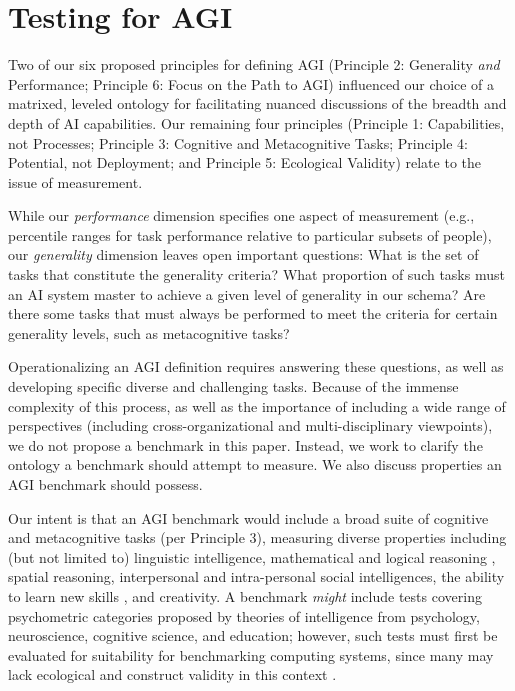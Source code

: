 \documentclass{article}
\theoremstyle{plain}
\theoremstyle{definition}
\theoremstyle{remark}
\begin{document}
\section{Testing for AGI}
\label{testing}

Two of our six proposed principles for defining AGI (Principle 2: Generality \textit{and} Performance; Principle 6: Focus on the Path to AGI) influenced our choice of a matrixed, leveled ontology for facilitating nuanced discussions of the breadth and depth of AI capabilities. Our remaining four principles (Principle 1: Capabilities, not Processes; Principle 3: Cognitive and Metacognitive Tasks; Principle 4: Potential, not Deployment; and Principle 5: Ecological Validity) relate to the issue of measurement.  

While our \textit{performance} dimension specifies one aspect of measurement (e.g., percentile ranges for task performance relative to particular subsets of people), our \textit{generality} dimension leaves open important questions: What is the set of tasks that constitute the generality criteria? What proportion of such tasks must an AI system master to achieve a given level of generality in our schema? Are there some tasks that must always be performed to meet the criteria for certain generality levels, such as metacognitive tasks?

Operationalizing an AGI definition requires answering these questions, as well as developing specific diverse and challenging tasks. Because of the immense complexity of this process, as well as the importance of including a wide range of perspectives (including cross-organizational and multi-disciplinary viewpoints), we do not propose a benchmark in this paper. Instead, we work to clarify the ontology a benchmark should attempt to measure. We also discuss properties an AGI benchmark should possess. 

Our intent is that an AGI benchmark would include a broad suite of cognitive and metacognitive tasks (per Principle 3), measuring diverse properties including (but not limited to) linguistic intelligence, mathematical and logical reasoning \citep{logic}, spatial reasoning, interpersonal and intra-personal social intelligences, the ability to learn new skills \citep{chollet2019measure}, and creativity. A benchmark \textit{might} include tests covering psychometric categories proposed by theories of intelligence from psychology, neuroscience, cognitive science, and education; however, such tests must first be evaluated for suitability for benchmarking computing systems, since many may lack ecological and construct validity in this context \citep{serapio2023personality}. 
\end{document}

